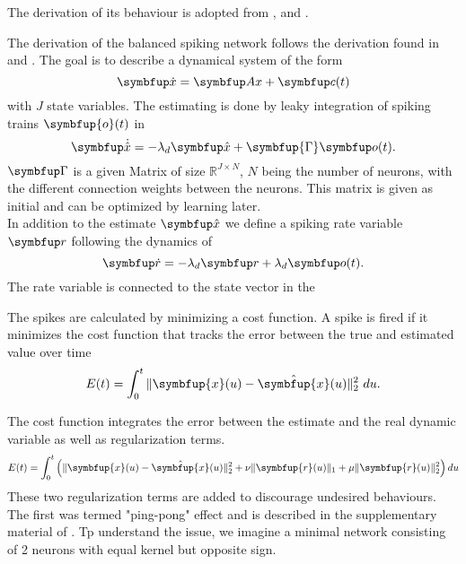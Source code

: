 The derivation of its behaviour is adopted from \cite{boerlin_predictive_2013},\cite{huang_spiking_2019} and \cite{huang_optimizing_2017}.

The derivation of the balanced spiking network follows the derivation found in \cite{boerlin_predictive_2013} and \cite{huang_dynamics_2019}.
The goal is to describe a dynamical system of the form
\begin{equation}\label{eq:x}
	\bmu{\dot{x}} = \bmu{Ax} + \bmu{c}(t)
\end{equation}
with $J$ state variables.
The estimating is done by leaky integration of spiking trains $\symbfup{o}(t)$ in
\begin{equation}\label{eq:x_hat}
	\bmu{\dot{\hat{x}}} = -\lambda_d \bmu{\hat{x}} + \symbfup{\Gamma} \bmu{o}(t).
\end{equation}
$\bmu{\Gamma}$ is a given Matrix of size $\mathbb{R}^{J\times N}$, $N$ being the number of neurons, with the different connection weights between the neurons. This matrix is given as initial and can be optimized by learning later.\\
In addition to the estimate $\bmu{\hat{x}}$ we define a spiking rate variable $\bmu{r}$ following the dynamics of
\begin{equation}\label{eq:rate}
	\bmu{\dot{r}} = -\lambda_d\bmu{r} + \lambda_d \bmu{o}(t).
\end{equation}
The rate variable is connected to the state vector in the


The spikes are calculated by minimizing a cost function. A spike is fired if it minimizes the cost function that tracks the error between the true and estimated value over time
\begin{equation}
E(t)=\int_0^t \|\symbfup{x}(u)-\hat{\symbfup{x}}(u)\|_2^2 \ du.
\end{equation}

The cost function integrates the error between the estimate and the real dynamic variable as well as regularization terms.
\begin{equation}\label{eq:cost_func}
E(t)=\int_0^t \left(\|\symbfup{x}(u)-\hat{\symbfup{x}}(u)\|_2^2+\nu\|\symbfup{r}(u)\|_1+\mu\|\symbfup{r}(u)\|_2^2\right)d u
\end{equation}
These two regularization terms are added to discourage undesired behaviours.\\
The first was termed "ping-pong" effect and is described in the supplementary material of \cite{boerlin_predictive_2013}. Tp understand the issue, we imagine a minimal network consisting of 2 neurons with equal kernel but opposite sign. \\

